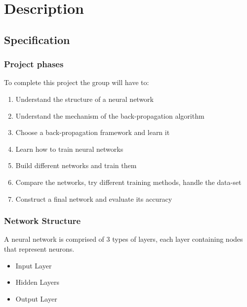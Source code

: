 \documentclass[11pt]{article}
\begin{document}
\section{Description}
\subsection{Specification}

\subsubsection{Project phases}
\label{sec:phases}
To complete this project the group will have to:
\begin{enumerate}
\item Understand the structure of a neural network
\item Understand the mechanism of the back-propagation algorithm
\item Choose a back-propagation framework and learn it
\item Learn how to train neural networks
\item Build different networks and train them
\item Compare the networks, try different training methods, handle the data-set
\item Construct a final network and evaluate its accuracy
\end{enumerate}

\subsubsection{Network Structure}
\label{sec:network}
A neural network is comprised of 3 types of layers, each layer containing nodes that represent neurons.
\begin{itemize}
\item Input Layer
\item Hidden Layers
\item Output Layer
\end{itemize}
\end{document}
